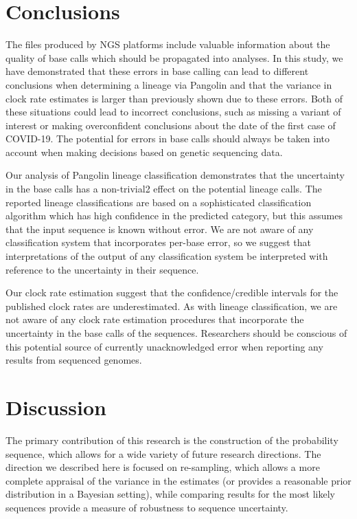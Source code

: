 \documentclass[12pt]{article}
\begin{document}
\section{Conclusions}

The files produced by NGS platforms include valuable information about the quality of base calls which should be propagated into analyses.
In this study, we have demonstrated that these errors in base calling can lead to different conclusions when determining a lineage via Pangolin and that the variance in clock rate estimates is larger than previously shown due to these errors.
Both of these situations could lead to incorrect conclusions, such as missing a variant of interest or making overconfident conclusions about the date of the first case of COVID-19.
The potential for errors in base calls should always be taken into account when making decisions based on genetic sequencing data.

Our analysis of Pangolin lineage classification demonstrates that the uncertainty in the base calls has a non-trivial2 effect on the potential lineage calls.
The reported lineage classifications are based on a sophisticated classification algorithm which has high confidence in the predicted category, but this assumes that the input sequence is known without error.
We are not aware of any classification system that incorporates per-base error, so we suggest that interpretations of the output of any classification system be interpreted with reference to the uncertainty in their sequence.

Our clock rate estimation suggest that the confidence/credible intervals for the published clock rates are underestimated.
As with lineage classification, we are not aware of any clock rate estimation procedures that incorporate the uncertainty in the base calls of the sequences.
Researchers should be conscious of this potential source of currently unacknowledged error when reporting any results from sequenced genomes.

\section{Discussion}

The primary contribution of this research is the construction of the probability sequence, which allows for a wide variety of future research directions.
The direction we described here is focused on re-sampling, which allows a more complete appraisal of the variance in the estimates (or provides a reasonable prior distribution in a Bayesian setting), while comparing results for the most likely sequences provide a measure of robustness to sequence uncertainty.
\end{document}
